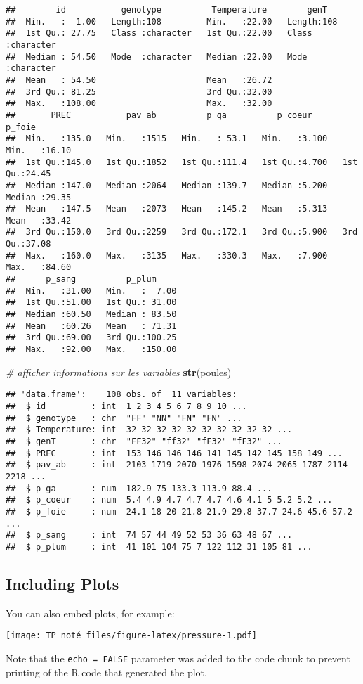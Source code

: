 \documentclass[
]{article}
\newenvironment{Shaded}{\begin{snugshade}}{\end{snugshade}}
\newcommand{\CommentTok}[1]{\textcolor[rgb]{0.56,0.35,0.01}{\textit{#1}}}
\newcommand{\FunctionTok}[1]{\textcolor[rgb]{0.13,0.29,0.53}{\textbf{#1}}}
\newcommand{\NormalTok}[1]{#1}
\begin{document}
\begin{verbatim}
##        id           genotype          Temperature        genT          
##  Min.   :  1.00   Length:108         Min.   :22.00   Length:108        
##  1st Qu.: 27.75   Class :character   1st Qu.:22.00   Class :character  
##  Median : 54.50   Mode  :character   Median :22.00   Mode  :character  
##  Mean   : 54.50                      Mean   :26.72                     
##  3rd Qu.: 81.25                      3rd Qu.:32.00                     
##  Max.   :108.00                      Max.   :32.00                     
##       PREC           pav_ab          p_ga          p_coeur          p_foie     
##  Min.   :135.0   Min.   :1515   Min.   : 53.1   Min.   :3.100   Min.   :16.10  
##  1st Qu.:145.0   1st Qu.:1852   1st Qu.:111.4   1st Qu.:4.700   1st Qu.:24.45  
##  Median :147.0   Median :2064   Median :139.7   Median :5.200   Median :29.35  
##  Mean   :147.5   Mean   :2073   Mean   :145.2   Mean   :5.313   Mean   :33.42  
##  3rd Qu.:150.0   3rd Qu.:2259   3rd Qu.:172.1   3rd Qu.:5.900   3rd Qu.:37.08  
##  Max.   :160.0   Max.   :3135   Max.   :330.3   Max.   :7.900   Max.   :84.60  
##      p_sang          p_plum      
##  Min.   :31.00   Min.   :  7.00  
##  1st Qu.:51.00   1st Qu.: 31.00  
##  Median :60.50   Median : 83.50  
##  Mean   :60.26   Mean   : 71.31  
##  3rd Qu.:69.00   3rd Qu.:100.25  
##  Max.   :92.00   Max.   :150.00
\end{verbatim}

\begin{Shaded}
\begin{Highlighting}[]
\CommentTok{\# afficher informations sur les variables}
\FunctionTok{str}\NormalTok{(poules)}
\end{Highlighting}
\end{Shaded}

\begin{verbatim}
## 'data.frame':    108 obs. of  11 variables:
##  $ id         : int  1 2 3 4 5 6 7 8 9 10 ...
##  $ genotype   : chr  "FF" "NN" "FN" "FN" ...
##  $ Temperature: int  32 32 32 32 32 32 32 32 32 32 ...
##  $ genT       : chr  "FF32" "ff32" "fF32" "fF32" ...
##  $ PREC       : int  153 146 146 146 141 145 142 145 158 149 ...
##  $ pav_ab     : int  2103 1719 2070 1976 1598 2074 2065 1787 2114 2218 ...
##  $ p_ga       : num  182.9 75 133.3 113.9 88.4 ...
##  $ p_coeur    : num  5.4 4.9 4.7 4.7 4.7 4.6 4.1 5 5.2 5.2 ...
##  $ p_foie     : num  24.1 18 20 21.8 21.9 29.8 37.7 24.6 45.6 57.2 ...
##  $ p_sang     : int  74 57 44 49 52 53 36 63 48 67 ...
##  $ p_plum     : int  41 101 104 75 7 122 112 31 105 81 ...
\end{verbatim}

\hypertarget{including-plots}{%
\subsection{Including Plots}\label{including-plots}}

You can also embed plots, for example:

\texttt{[image: TP\_noté\_files/figure-latex/pressure-1.pdf]}

Note that the \texttt{echo\ =\ FALSE} parameter was added to the code
chunk to prevent printing of the R code that generated the plot.
\end{document}
